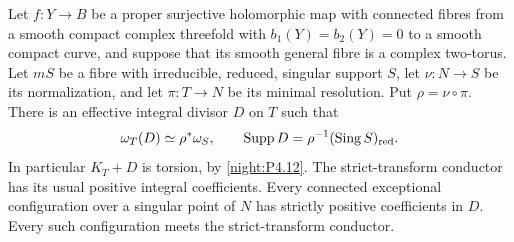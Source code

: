 \begin{proposition}\hypertarget{tag-02YI}{}\label{night:P4R.6}\label{stmt:P4R.6}

Let $f:Y\to B$ be a proper surjective holomorphic map with connected
fibres from a smooth compact complex threefold with $b_1(Y)=b_2(Y)=0$
to a smooth compact curve, and suppose that its smooth general fibre
is a complex two-torus. Let $mS$ be a fibre with irreducible, reduced,
singular support $S$, let $\nu:N\to S$ be its normalization, and let
$\pi:T\to N$ be its minimal resolution. Put $\rho=\nu\circ\pi$.
There is an effective integral divisor $D$ on $T$ such that
\[
 \omega_T(D)\simeq\rho^*\omega_S,
 \qquad \operatorname{Supp}D
       =\rho^{-1}(\operatorname{Sing}S)_{\rm red}.
\]
In particular $K_T+D$ is torsion, by \cref{night:P4.12}.
The strict-transform conductor has its usual positive integral
coefficients. Every connected exceptional configuration over a
singular point of $N$ has strictly positive coefficients in $D$.
Every such configuration meets the strict-transform conductor.
\end{proposition}
